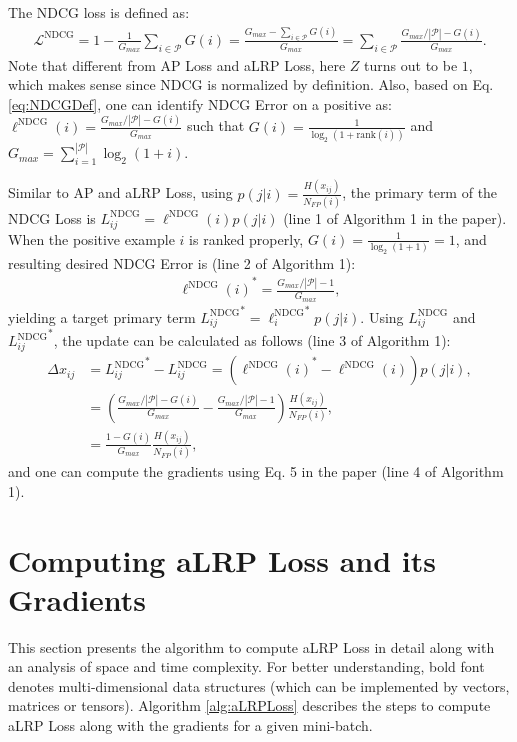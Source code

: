 \documentclass{article}
\begin{document}
The NDCG loss is defined as:
\begin{align}
\label{eq:NDCGDef}
    \mathcal{L}^{\mathrm{NDCG}} =1 - \frac{1}{G_{max}} \sum \limits_{i \in \mathcal{P}}G(i) = \frac{G_{max}-\sum \limits_{i \in \mathcal{P}}G(i)}{G_{max}} =  \sum \limits_{i \in \mathcal{P}} \frac{G_{max}/|\mathcal{P}| - G(i)}{G_{max}}.
\end{align}
Note that different from AP Loss and aLRP Loss, here $Z$ turns out to be $1$, which makes sense since NDCG is normalized by definition. Also, based on Eq. \ref{eq:NDCGDef}, one can identify NDCG Error on a positive as: $\ell^{\mathrm{NDCG}}(i) = \frac{G_{max}/|\mathcal{P}| - G(i)}{G_{max}}$ such that $G(i) = \frac{1}{\log_2(1+\mathrm{rank}(i))}$ and  $G_{max} = \sum \limits_{i =1}^{ |\mathcal{P}|}\log_2(1+i)$.  

Similar to AP and aLRP Loss, using $p(j|i) = \frac{H(x_{ij})}{N_{FP}(i)}$, the primary term of the NDCG Loss is $L^\mathrm{NDCG}_{ij} = \ell^\mathrm{NDCG} (i) p(j|i)$ (line 1 of Algorithm 1 in the paper). When the positive example $i$ is ranked properly, $G(i) = \frac{1}{\log_2(1+1)}=1$, and resulting desired NDCG Error is (line 2 of Algorithm 1):
\begin{align}
{\ell^\mathrm{NDCG}(i)}^* =\frac{G_{max}/|\mathcal{P}|-1}{G_{max}},
\end{align}
yielding a target primary term ${L^\mathrm{NDCG}_{ij}}^*={\ell^\mathrm{NDCG}_{i}}^* p(j|i)$. Using ${L^\mathrm{NDCG}_{ij}}$ and ${L^\mathrm{NDCG}_{ij}}^*$, the update can be calculated as follows (line 3 of Algorithm 1):
\begin{align}
    \label{eq:NDCGClassificationGrads}
     \Delta x_{ij}&={L_{ij}^{\mathrm{NDCG}}}^*-L^{\mathrm{NDCG}}_{ij}=\left({\ell^\mathrm{NDCG}(i)}^*- \ell^\mathrm{NDCG}(i) \right) p(j|i), \\
    &= \left( \frac{G_{max}/|\mathcal{P}| - G(i)}{G_{max}} - \frac{G_{max}/|\mathcal{P}|-1}{G_{max}} \right) \frac{H(x_{ij})}{N_{FP}(i)} ,  \\
    &= \frac{1- G(i)}{G_{max}} \frac{H(x_{ij})}{N_{FP}(i)},
\end{align}
and one can compute the gradients using Eq. 5 in the paper (line 4 of Algorithm 1). \section{Computing aLRP Loss and its Gradients}
This section presents the algorithm to compute aLRP Loss in detail along with an analysis of space and time complexity. For better understanding, bold font denotes multi-dimensional data structures (which can be implemented by vectors, matrices or tensors). Algorithm \ref{alg:aLRPLoss} describes the steps to compute aLRP Loss along with the gradients for a given mini-batch. 
\end{document}

